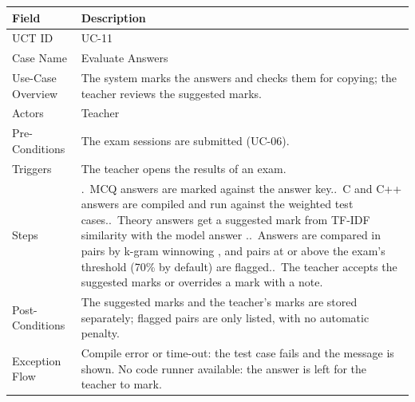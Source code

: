 \begin{lrbox}{\uctbox}{\small\renewcommand{\arraystretch}{1.1}\setlength{\tabcolsep}{6pt}%
\begin{tabular}{>{\raggedright\arraybackslash}p{3.6cm}>{\raggedright\arraybackslash}p{\dimexpr\textwidth-3.6cm-4\tabcolsep\relax}}
\hline\hline
\textbf{Field} & \textbf{Description} \\ \hline
UCT ID & UC-11 \\
Case Name & Evaluate Answers \\
Use-Case Overview & The system marks the answers and checks them for copying; the teacher reviews the suggested marks. \\
Actors & Teacher \\
Pre-Conditions & The exam sessions are submitted (UC-06). \\
Triggers & The teacher opens the results of an exam. \\
Steps & 1.~MCQ answers are marked against the answer key.\newline
2.~C and C++ answers are compiled and run against the weighted test cases.\newline
3.~Theory answers get a suggested mark from TF-IDF similarity with the model answer \cite{salton1988}.\newline
4.~Answers are compared in pairs by k-gram winnowing \cite{winnowing}, and pairs at or above the exam's threshold (70\% by default) are flagged.\newline
5.~The teacher accepts the suggested marks or overrides a mark with a note. \\
Post-Conditions & The suggested marks and the teacher's marks are stored separately; flagged pairs are only listed, with no automatic penalty. \\
Exception Flow & Compile error or time-out: the test case fails and the message is shown. No code runner available: the answer is left for the teacher to mark. \\
\hline\hline
\end{tabular}}\end{lrbox}
\begin{table}[H]
\centering
\caption{Use Case Table for Evaluate Answers}\label{tab:uc11}
\vspace{4pt}
\usebox{\uctbox}
\end{table}

